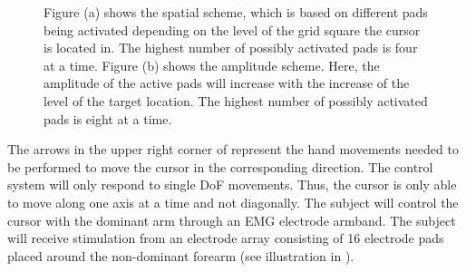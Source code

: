\begin{figure} [H]
	\caption{Figure (a) shows the spatial scheme, which is based on different pads being activated depending on the level of the grid square the cursor is located in. The highest number of possibly activated pads is four at a time. Figure (b) shows the amplitude scheme. Here, the amplitude of the active pads will increase with the increase of the level of the target location. The highest number of possibly activated pads is eight at a time.}
	\label{fig:sensconfigs}
\end{figure}


The arrows in the upper right corner of  represent the hand movements needed to be performed to move the cursor in the corresponding direction. The control system will only respond to single DoF movements. Thus, the cursor is only able to move along one axis at a time and not diagonally. The subject will control the cursor with the dominant arm through an EMG electrode armband. The subject will receive stimulation from an electrode array consisting of 16 electrode pads placed around the non-dominant forearm (see illustration in ).



